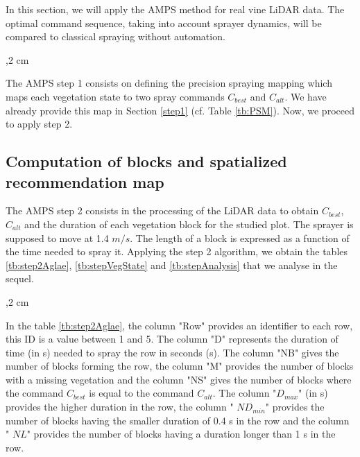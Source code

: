 \documentclass[preprint,3p,times,twocolumn]{elsarticle}
\begin{document}
In this section, we will apply the AMPS method for real vine LiDAR data. The optimal command sequence, taking into account sprayer dynamics, will be compared to classical spraying without automation.

,2 cm

The AMPS step 1 consists on defining the precision spraying mapping which maps each vegetation state to two spray commands $C_{best}$ and $C_{alt}$. We have already provide this map in Section \ref{step1} (cf. Table \ref{tb:PSM}). Now, we proceed to apply step 2.

\subsection{Computation of blocks and spatialized recommendation map}

The AMPS step 2 consists in the processing of the LiDAR data to obtain $C_{best}$, $C_{alt}$ and the duration of each vegetation block for the studied plot. The sprayer is supposed to move at 1.4 $m/s$. The length of a block is expressed as a function of the time needed to spray it. Applying the step 2 algorithm, we obtain the tables \ref{tb:step2Aglae}, \ref{tb:stepVegState} and \ref{tb:stepAnalysis} that we analyse in the sequel.

,2 cm

In the table \ref{tb:step2Aglae}, the column "Row" provides an identifier to each row, this ID is a value between 1 and 5. The column "D" represents the duration of time (in s) needed to spray the row in seconds (s). The column "NB" gives the number of blocks forming the row, the column "M" provides the number of blocks with a missing vegetation and the column "NS" gives the number of blocks where the command $C_{best}$ is equal to the command $C_{alt}$. The column "$D_{max}$" (in s) provides the higher duration in the row, the column " $ND_{min}$" provides the number of blocks having the smaller duration of 0.4 s in the row and the column " $NL$" provides the number of blocks having a duration longer than 1 s in the row.
\end{document}
